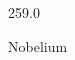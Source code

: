 \documentclass[12pt]{article}
\begin{document}
\hfill{}
\vfill
\begin{center}
  {\fontsize{50}{60}
  }

  \vspace{1em}

  259.0

Nobelium
\end{center}
\vfill
\end{document}
